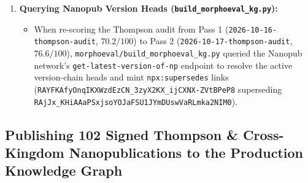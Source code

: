 \documentclass[10.5pt,a4paper]{article}
\newcommand{\code}[1]{{\footnotesize\nolinkurl{#1}}}
\begin{document}
\begin{enumerate}
\begin{itemize}
    \begin{quote}\footnotesize\ttfamily
      pk:evidenceAgainst\\
      \hspace*{1em}"remediation needed: Fit the maps to the outlines themselves (sliding semilandmarks on the two silhouettes) as well as to the landmarks, so Thompson's family gets its best chance on the form he deformed." ,\\
      \hspace*{1em}"remediation needed: Sweep the complex constant c at fixed affine part in a panel, and report the fitted constants for the 54 Chaetodon species..." ;
    \end{quote}
    \item Reading those \texttt{pk:evidenceAgainst} triples directly identified the methodological gap: the 2026-10-17 script had fitted the coordinate grids \emph{only to the 17 skeletal landmarks} and merely projected the resulting map onto the silhouette (where $\mathrm{IoU}$ dropped from $0.662 \to 0.618$), never fitting Thompson's coordinate families directly to the 600-point outlines or testing the other three 1917 fish families. Executing that exact KG remediation item is what uncovered the 17-landmark vs.\ 600-point silhouette paradox!
  \end{itemize}
  \item \textbf{Querying Nanopub Version Heads (\code{build_morphoeval_kg.py}):}
  \begin{itemize}
    \setlength{\itemsep}{2pt}
    \item When re-scoring the Thompson audit from Pass 1 (\code{2026-10-16-thompson-audit}, $70.2/100$) to Pass 2 (\code{2026-10-17-thompson-audit}, $76.6/100$), \code{morphoeval/build_morphoeval_kg.py} queried the Nanopub network's \code{get-latest-version-of-np} endpoint to resolve the active version-chain heads and mint \texttt{npx:supersedes} links (\code{RAYFKAfyOnqIKXWzdEzCN_3zyX2KX_ijCXNX-ZVtBPeP8} superseding \code{RAjJx_KHiAAaPSxjsoYOJaFSU1JYmDUswVaRLmka2NIM0}).
  \end{itemize}
\end{enumerate}

\subsection{Publishing 102 Signed Thompson \& Cross-Kingdom Nanopublications to the Production Knowledge Graph}
\end{document}

